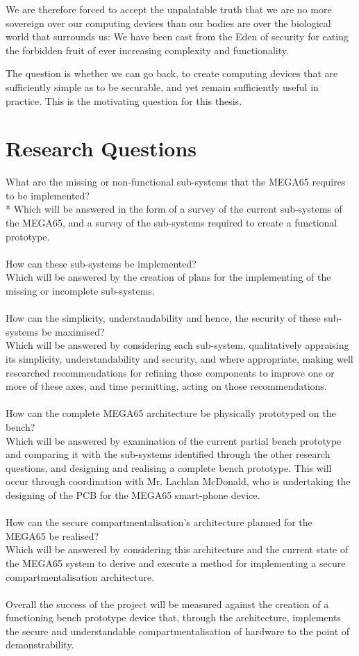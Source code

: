 We are therefore forced to accept the unpalatable truth that we are no more sovereign over our computing devices than our bodies
are over the biological world that surrounds us: We have been cast from the Eden of security for eating the forbidden fruit of
ever increasing complexity and functionality.

The question is whether we can go back, to create computing devices that are sufficiently simple as to be securable, and yet
remain sufficiently useful in practice.  This is the motivating question for this thesis.

\section{Research Questions}

\label{Ch1 Sec2}

What are the missing or non-functional sub-systems that the MEGA65 requires to be implemented?\\*
Which will be answered in the form of a survey of the current sub-systems of the MEGA65, and a survey of the sub-systems required to create a functional prototype.\\
\\
How can these sub-systems be implemented?\\
Which will be answered by the creation of plans for the implementing of the missing or incomplete sub-systems.\\
\\
How can the simplicity, understandability and hence, the security of these sub-systems be maximised?\\
Which will be answered by considering each sub-system, qualitatively appraising its simplicity, understandability and security, and where appropriate, making well researched recommendations for refining those components to improve one or more of these axes, and time permitting, acting on those recommendations.\\
\\
How can the complete MEGA65 architecture be physically prototyped on the bench?\\
Which will be answered by examination of the current partial bench prototype and comparing it with the sub-systems identified through the other research questions, and designing and realising a complete bench prototype.
This will occur through coordination with Mr. Lachlan McDonald, who is undertaking the designing of the PCB for the MEGA65 smart-phone device.\\
\\
How can the secure compartmentalisation's architecture planned for the MEGA65 be realised?\\
Which will be answered by considering this architecture and the current state of the MEGA65 system to derive and execute a method for implementing a secure compartmentalisation architecture.\\
\\
Overall the success of the project will be measured against the creation of a functioning bench prototype device that, through the architecture, implements the secure and understandable compartmentalisation of hardware to the point of demonstrability.

